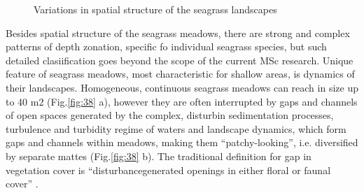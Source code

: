 \documentclass[10pt, a4paper]{article}
\begin{document}
\begin{figure}[h]
	\centering
	\caption{Variations in spatial structure of the seagrass landscapes}
	\label{fig:41}
\end{figure}

Besides spatial structure of the seagrass meadows, there are strong and complex patterns of depth zonation, specific fo individual
seagrass species, but such detailed clasiification goes beyond the scope of the current MSc research.
Unique feature of seagrass meadows, most characteristic for shallow areas, is dynamics of their
landscapes. Homogeneous, continuous seagrass meadows can reach in size up to 40 m2 (Fig.\ref{fig:38} a),
however they are often interrupted by gaps and channels of open spaces generated by the complex,
disturbin sedimentation processes, turbulence and turbidity regime of waters and landscape dynamics,
which form gaps and channels within meadows, making them “patchy-looking”, i.e. diversified by
separate mattes (Fig.\ref{fig:38} b). The traditional definition for gap in vegetation cover is “disturbancegenerated
openings in either floral or faunal cover” \cite{Connell78}\label{Connell78}.
\end{document}
